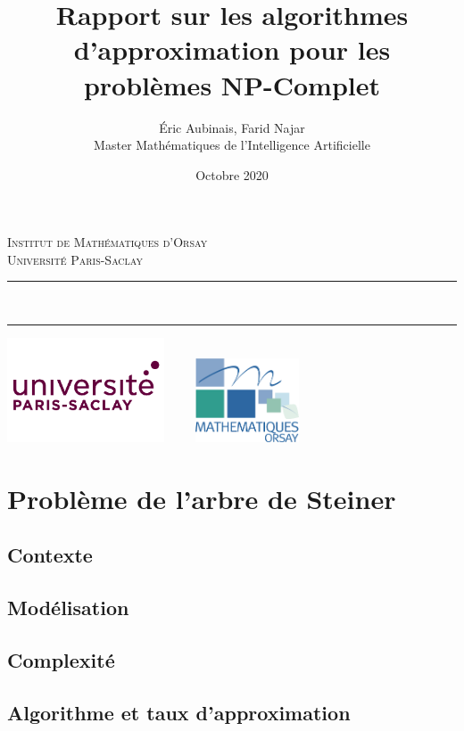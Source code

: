 \documentclass[11pt,french]{report}
\newcommand{\HRule}{\rule{\linewidth}{0.5mm}}
\begin{document}
	\title{Rapport sur les algorithmes d'approximation pour les problèmes NP-Complet\\}
	\author{
		Éric Aubinais, Farid Najar\\[0.2cm]
		Master Mathématiques de l'Intelligence Artificielle }
	\date{Octobre 2020}
	\makeatletter
	\begin{titlepage}
		\centering
		\textsc{\LARGE Institut de Mathématiques d'Orsay \\ Université Paris-Saclay}\\[4cm]
		\HRule \\
		{ \huge \bfseries \@title[2cm] }
		\begin{Large}
			\@author
		\end{Large}
		\HRule
		\vfill
		\includegraphics[width=0.35\textwidth]{paris-saclay.png}
		\hfill
		\includegraphics[width=0.35\textwidth, height=2.5cm]{imo.png}
		\pagebreak
		\tableofcontents
		\pagebreak
	\end{titlepage}

	\chapter{Problème de l'arbre de Steiner}
	\section{Contexte}
	
	\section{Modélisation}
	
	\section{Complexité}
	
	\section{Algorithme et taux d'approximation}
\end{document}
